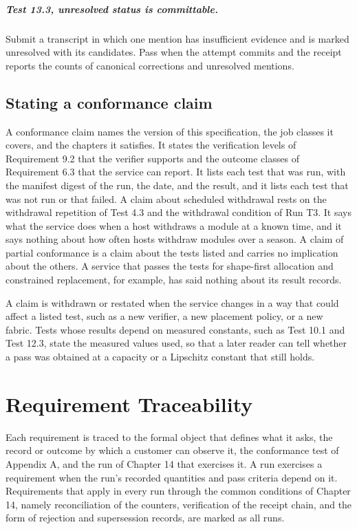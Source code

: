 \documentclass[11pt,openany]{book}
\theoremstyle{remark}
\begin{document}
\paragraph{Test 13.3, unresolved status is committable.} Submit a transcript in which one mention has insufficient evidence and is marked unresolved with its candidates. Pass when the attempt commits and the receipt reports the counts of canonical corrections and unresolved mentions.


\section{Stating a conformance claim}

A conformance claim names the version of this specification, the job classes it covers, and the chapters it satisfies. It states the verification levels of Requirement 9.2 that the verifier supports and the outcome classes of Requirement 6.3 that the service can report. It lists each test that was run, with the manifest digest of the run, the date, and the result, and it lists each test that was not run or that failed. A claim about scheduled withdrawal rests on the withdrawal repetition of Test 4.3 and the withdrawal condition of Run T3. It says what the service does when a host withdraws a module at a known time, and it says nothing about how often hosts withdraw modules over a season. A claim of partial conformance is a claim about the tests listed and carries no implication about the others. A service that passes the tests for shape-first allocation and constrained replacement, for example, has said nothing about its result records.

A claim is withdrawn or restated when the service changes in a way that could affect a listed test, such as a new verifier, a new placement policy, or a new fabric. Tests whose results depend on measured constants, such as Test 10.1 and Test 12.3, state the measured values used, so that a later reader can tell whether a pass was obtained at a capacity or a Lipschitz constant that still holds.

\chapter{Requirement Traceability}

Each requirement is traced to the formal object that defines what it asks, the record or outcome by which a customer can observe it, the conformance test of Appendix A, and the run of Chapter 14 that exercises it. A run exercises a requirement when the run's recorded quantities and pass criteria depend on it. Requirements that apply in every run through the common conditions of Chapter 14, namely reconciliation of the counters, verification of the receipt chain, and the form of rejection and supersession records, are marked as all runs.
\end{document}
